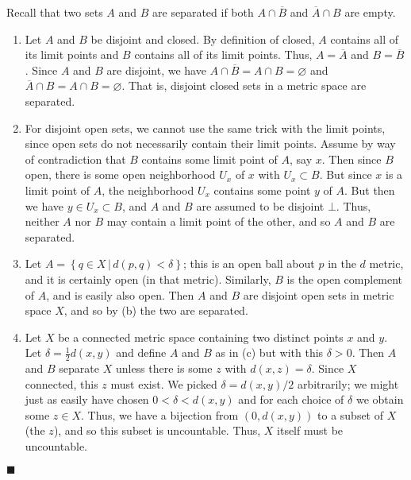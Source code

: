 \documentclass[12pt]{article}
\renewcommand{\qed}{\hfill$\blacksquare$}
\renewenvironment{proof}{\begin{addmargin}[1em]{0em}\begin{newproof}}{\end{newproof}\end{addmargin}\qed}
\begin{document}
\begin{proof}
{\color{red}Recall that two sets $A$ and $B$ are separated if both $A\cap \overline{B}$ and $\overline{A}\cap B$ are empty.}
\begin{enumerate}[label=(\alph*)]
	\item Let $A$ and $B$ be disjoint and closed. By definition of closed, $A$ contains all of its limit points and $B$ contains all of its limit points. Thus, $A=\overline{A}$ and $B=\overline{B}$. Since $A$ and $B$ are disjoint, we have $A\cap \overline{B} = A\cap B = \varnothing$ and $\overline{A}\cap B = A\cap B = \varnothing$. That is, disjoint closed sets in a metric space are separated.
	\item {\color{red}For disjoint open sets, we cannot use the same trick with the limit points, since open sets do not necessarily contain their limit points.} Assume by way of contradiction that $B$ contains some limit point of $A$, say $x$. Then since $B$ open, there is some open neighborhood $U_x$ of $x$ with $U_x \subset B$. But since $x$ is a limit point of $A$, the neighborhood $U_x$ contains some point $y$ of $A$. But then we have $y \in U_x \subset B$, and $A$ and $B$ are assumed to be disjoint $\bot$. Thus, neither $A$ nor $B$ may contain a limit point of the other, and so $A$ and $B$ are separated.
	\item Let $A= \left\{ q\in X\, | \, d\left(p,q\right) < \delta \right\}${\color{red}; this is an open ball about $p$ in the $d$ metric, and it is certainly open (in that metric)}. Similarly, $B$ is the open complement of $A$, and is easily also open. Then $A$ and $B$ are disjoint open sets in metric space $X$, and so by (b) the two are separated.
	\item Let $X$ be a connected metric space containing two distinct points $x$ and $y$. Let $\delta = \frac{1}{2}d\left(x,y\right)$ and define $A$ and $B$ as in (c) but with this $\delta >0$. Then $A$ and $B$ separate $X$ unless there is some $z$ with $d\left(x,z\right) = \delta$. Since $X$ connected, this $z$ must exist. We picked $\delta = d\left(x,y\right)/2$ arbitrarily; we might just as easily have chosen $0<\delta <d\left(x,y\right)$ and for each choice of $\delta$ we obtain some $z\in X$. Thus, we have a bijection from $\left(0,d\left(x,y\right)\right)$ to a subset of $X$ (the $z$), and so this subset is uncountable. Thus, $X$ itself must be uncountable.
\end{enumerate}
\end{proof}
\end{document}
